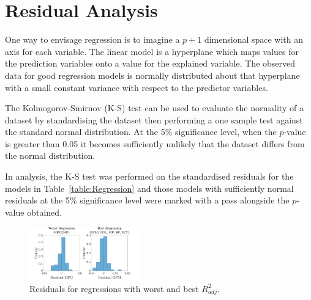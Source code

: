 \documentclass[a4paper,10pt,twocolumn]{article}
\begin{document}
\section{Residual Analysis}

One way to envisage regression is to imagine a $p+1$ dimensional space with 
an axis for each variable. The linear model is a hyperplane which maps values 
for the prediction variables onto a value for the explained variable. The 
observed data for good regression models is normally distributed about that 
hyperplane with a small constant variance with respect to the predictor 
variables.

The Kolmogorov-Smirnov (K-S) test can be used to evaluate the normality of a 
dataset by standardising the dataset then performing a one sample test against 
the standard normal distribution. At the 5\% significance level, when the 
$p$-value is greater than 0.05 it becomes sufficiently unlikely that the 
dataset differs from the normal distribution.

In analysis, the K-S test was performed on the standardised residuals for the 
models in Table~\ref{table:Regression} and those models with sufficiently 
normal residuals at the 5\% significance level were marked with a pass 
alongside the $p$-value obtained.

\begin{figure}[h]
    \centering
    \includegraphics[width=0.42\textwidth]{Residuals}
    \caption{Residuals for regressions with worst and best $R^2_{adj}$.}
    \label{fig:Residuals}
\end{figure}

\printbibliography

\clearpage
\end{document}
